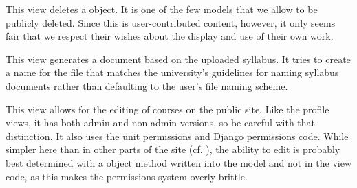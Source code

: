 \documentclass[letterpaper,10pt,english]{sphinxmanual}
\begin{document}

\begin{fulllineitems}
\label{generated/apps.profiles.views:apps.profiles.views.delete_work}
This view deletes a  object.  It is one of the few models
that we allow to be publicly deleted.  Since this is user-contributed content,
however, it only seems fair that we respect their wishes about the display
and use of their own work.

\end{fulllineitems}



\begin{fulllineitems}
\label{generated/apps.profiles.views:apps.profiles.views.download_syllabus}
This view generates a document based on the uploaded syllabus.
It tries to create a name for the file that matches the university's
guidelines for naming syllabus documents rather than defaulting to
the user's file naming scheme.

\end{fulllineitems}



\begin{fulllineitems}
\label{generated/apps.profiles.views:apps.profiles.views.edit_course_profile}
This view allows for the editing of courses on the public site.
Like the  profile views, it has both admin and non-admin
versions, so be careful with that distinction.  It also uses the 
unit permissions and Django permissions code.  While simpler here than
in other parts of the site (cf. ), the ability to 
edit is probably best determined with a object method written into the 
model and not in the view code, as this makes the permissions system
overly brittle.

\end{fulllineitems}


\end{document}
